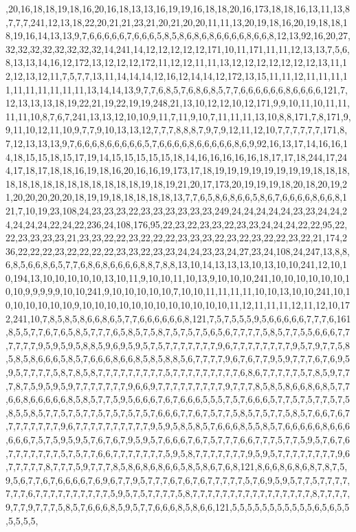 ,20,16,18,18,19,18,16,20,16,18,13,13,16,19,19,16,18,18,20,16,173,18,18,16,13,11,13,8,7,7,7,241,12,13,18,22,20,21,21,23,21,20,21,20,20,11,11,13,20,19,18,16,20,19,18,18,18,19,16,14,13,13,9,7,6,6,6,6,6,7,6,6,6,5,8,5,8,6,8,6,8,6,6,6,6,8,6,6,8,12,13,92,16,20,27,32,32,32,32,32,32,32,32,14,241,14,12,12,12,12,12,171,10,11,171,11,11,12,13,13,7,5,6,8,13,13,14,16,12,172,13,12,12,12,172,11,12,12,11,11,13,12,12,12,12,12,12,12,13,11,12,12,13,12,11,7,5,7,7,13,11,14,14,14,12,16,12,14,14,12,172,13,15,11,11,12,11,11,11,11,11,11,11,11,11,11,13,14,14,13,9,7,7,6,8,5,7,6,8,6,8,5,7,7,6,6,6,6,6,6,8,6,6,6,6,121,7,12,13,13,13,18,19,22,21,19,22,19,19,248,21,13,10,12,12,10,12,171,9,9,10,11,10,11,11,11,11,10,8,7,6,7,241,13,13,12,10,10,9,11,7,11,9,10,7,11,11,11,13,10,8,8,171,7,8,171,9,9,11,10,12,11,10,9,7,7,9,10,13,13,12,7,7,7,8,8,8,7,9,7,9,12,11,12,10,7,7,7,7,7,7,171,8,7,12,13,13,13,9,7,6,6,6,8,6,6,6,6,6,5,7,6,6,6,6,8,6,6,6,6,6,8,6,9,92,16,13,17,14,16,16,14,18,15,15,18,15,17,19,14,15,15,15,15,15,18,14,16,16,16,16,16,18,17,17,18,244,17,244,17,18,17,18,18,16,19,18,16,20,16,16,19,173,17,18,19,19,19,19,19,19,19,19,18,18,18,18,18,18,18,18,18,18,18,18,18,18,19,18,19,21,20,17,173,20,19,19,19,18,20,18,20,19,21,20,20,20,20,20,18,19,19,18,18,18,18,18,13,7,7,6,5,8,6,8,6,6,5,8,6,7,6,6,6,6,8,6,6,8,121,7,10,19,23,108,24,23,23,23,22,23,23,23,23,23,23,249,24,24,24,24,24,23,23,24,24,24,24,24,24,22,24,22,236,24,108,176,95,22,23,22,23,23,22,23,23,24,24,24,22,22,95,22,22,23,23,23,23,21,23,23,22,22,23,22,22,22,23,23,23,22,23,22,23,22,22,23,22,21,174,236,22,22,22,23,22,22,22,22,23,23,22,23,23,24,24,23,23,24,27,23,24,108,24,247,13,8,8,6,8,5,6,6,8,6,5,7,7,6,8,6,8,6,6,6,6,8,8,7,8,8,13,10,14,13,13,13,10,13,10,10,241,12,10,10,194,13,10,10,10,10,10,13,10,11,9,10,10,11,10,13,9,10,10,10,241,10,10,10,10,10,10,10,10,9,9,9,9,9,10,10,241,9,10,10,10,10,10,7,10,10,11,11,11,11,10,10,13,10,10,241,10,10,10,10,10,10,10,9,10,10,10,10,10,10,10,10,10,10,10,10,11,12,11,11,11,12,11,12,10,172,241,10,7,8,5,8,5,8,6,6,8,6,5,7,7,6,6,6,6,6,6,8,121,7,5,7,5,5,5,9,5,6,6,6,6,6,7,7,7,6,161,8,5,5,7,7,6,7,6,5,8,5,7,7,7,6,5,8,5,7,5,8,7,5,7,5,7,5,6,5,6,7,7,7,7,5,8,5,7,7,5,5,6,6,6,7,7,7,7,7,7,9,5,9,5,9,5,8,8,5,9,6,9,5,9,5,7,5,7,7,7,7,7,7,7,9,6,7,7,7,7,7,7,7,7,9,5,7,9,7,7,5,8,5,8,5,8,6,6,6,5,8,5,7,6,6,6,8,6,6,8,5,8,5,8,8,5,6,7,7,7,7,9,6,7,6,7,7,9,5,9,7,7,7,6,7,6,9,5,9,5,7,7,7,7,5,8,7,8,5,8,7,7,7,7,7,7,7,7,7,5,7,7,7,7,7,7,7,7,7,6,8,6,7,7,7,7,7,5,7,8,5,9,7,7,7,8,7,5,9,5,9,5,9,7,7,7,7,7,7,7,9,6,6,9,7,7,7,7,7,7,7,7,7,9,7,7,7,8,5,8,5,8,6,6,8,6,8,5,7,7,6,6,8,6,6,6,6,6,8,5,8,5,7,7,5,9,5,6,6,6,7,6,7,6,6,6,5,5,5,7,5,7,6,6,6,5,7,7,5,7,5,7,7,5,7,5,8,5,5,8,5,7,7,5,7,5,7,7,5,7,5,7,5,7,5,7,6,6,6,7,7,6,7,5,7,7,5,8,5,7,5,7,7,5,8,5,7,6,6,7,6,7,7,7,7,7,7,7,7,9,6,7,7,7,7,7,7,7,7,7,7,9,5,9,5,8,5,8,5,7,6,6,6,8,5,5,8,5,7,6,6,6,6,6,8,6,6,6,6,6,6,7,5,7,5,9,5,9,5,7,6,7,6,7,9,5,9,5,7,6,6,6,7,6,7,5,7,7,7,6,6,7,7,7,5,7,7,5,9,5,7,6,7,6,7,7,7,7,7,7,7,5,7,5,7,7,6,6,7,7,7,7,7,7,7,5,9,5,8,7,7,7,7,7,7,7,9,5,9,5,7,7,7,7,7,7,7,7,9,6,7,7,7,7,7,8,7,7,7,5,9,7,7,7,8,5,8,6,8,6,8,6,6,5,8,5,8,6,7,6,8,121,8,6,6,8,6,8,6,8,7,8,7,5,9,5,6,7,7,6,7,6,6,6,6,7,6,9,6,7,7,9,5,7,7,7,6,7,6,7,6,7,7,7,7,7,5,7,6,9,5,9,5,7,7,5,7,7,7,7,7,7,7,6,7,7,7,7,7,7,7,7,7,7,5,9,5,7,5,7,7,7,7,5,8,7,7,7,7,7,7,7,7,7,7,7,7,7,7,7,7,8,7,7,7,7,9,7,7,9,7,7,7,5,8,5,7,6,6,6,8,5,9,5,7,7,6,6,6,8,5,8,6,6,121,5,5,5,5,5,5,5,5,5,5,5,6,5,6,5,5,5,5,5,5,